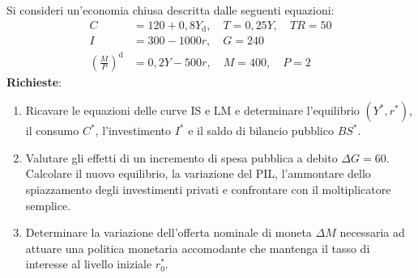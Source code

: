 \begin{esercizio}
Si consideri un'economia chiusa descritta dalle seguenti equazioni:
\begin{align*}
    C &= 120 + 0{,}8 Y_{\mathrm{d}}, \quad T = 0{,}25 Y, \quad TR = 50 \\
    I &= 300 - 1000 r, \quad G = 240 \\
    \left(\frac{M}{P}\right)^{\mathrm{d}} &= 0{,}2 Y - 500 r, \quad M = 400, \quad P = 2
\end{align*}
\textbf{Richieste}:
\begin{enumerate}
    \item Ricavare le equazioni delle curve IS e LM e determinare l'equilibrio $(Y^*, r^*)$, il consumo $C^*$, l'investimento $I^*$ e il saldo di bilancio pubblico $BS^*$.
    \item Valutare gli effetti di un incremento di spesa pubblica a debito $\Delta G = 60$. Calcolare il nuovo equilibrio, la variazione del PIL, l'ammontare dello spiazzamento degli investimenti privati e confrontare con il moltiplicatore semplice.
    \item Determinare la variazione dell'offerta nominale di moneta $\Delta M$ necessaria ad attuare una politica monetaria accomodante che mantenga il tasso di interesse al livello iniziale $r_0^*$.
\end{enumerate}


\end{esercizio}
